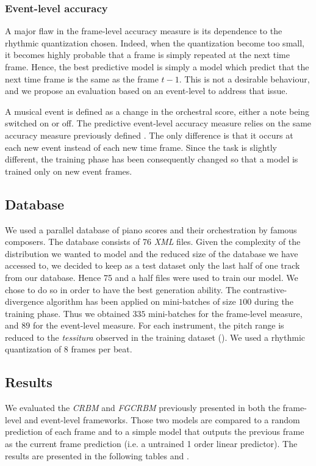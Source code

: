 \documentclass[letterpaper]{article}
\begin{document}
\subsubsection{Event-level accuracy}
A major flaw in the frame-level accuracy measure is its dependence to the rhythmic quantization chosen. Indeed, when the quantization become too small, it becomes highly probable that a frame is simply repeated at the next time frame. Hence, the best predictive model is simply a model which predict that the next time frame is the same as the frame $t-1$. This is not a desirable behaviour, and we propose an evaluation based on an event-level to address that issue.

A musical event is defined as a change in the orchestral score, either a note being switched on or off. The predictive event-level accuracy measure relies on the same accuracy measure previously defined . The only difference is that it occurs at each new event instead of each new time frame. Since the task is slightly different, the training phase has been consequently changed so that a model is trained only on new event frames.


\subsection{Database}
We used a parallel database of piano scores and their orchestration by famous composers. The database consists of 76 \textit{XML} files. Given the complexity of the distribution we wanted to model and the reduced size of the database we have accessed to, we decided to keep as a test dataset only the last half of one track from our database. Hence 75 and a half files were used to train our model. We chose to do so in order to have the best generation ability.
The contrastive-divergence algorithm has been applied on mini-batches of size $100$ during the training phase. Thus we obtained $335$ mini-batches for the frame-level measure, and $89$ for the event-level measure.
For each instrument, the pitch range is reduced to the \textit{tessitura} observed in the training dataset (\label{sec:data_representation}). We used a rhythmic quantization of 8 frames per beat.

\subsection{Results}
We evaluated the \textit{CRBM} and \textit{FGCRBM} previously presented  in both the frame-level and event-level frameworks. Those two models are compared to a random prediction of each frame and to a simple model that outputs the previous frame as the current frame prediction (i.e. a untrained 1 order linear predictor). The results are presented in the following tables  and .
\end{document}
